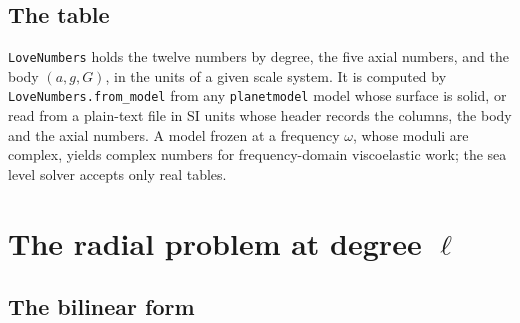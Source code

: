 \documentclass[11pt,a4paper]{article}
\newcommand{\code}[1]{\texttt{#1}}
\numberwithin{equation}{section}
\begin{document}
\subsection{The table}

\code{LoveNumbers} holds the twelve numbers by degree, the five axial numbers,
and the body $(a,g,G)$, in the units of a given scale system. It is computed by
\code{LoveNumbers.from\_model} from any \texttt{planetmodel} model whose
surface is solid, or read from a plain-text file in SI units whose header
records the columns, the body and the axial numbers. A model frozen at a
frequency $\omega$, whose moduli are complex, yields complex numbers for
frequency-domain viscoelastic work; the sea level solver accepts only real
tables.

\section{The radial problem at degree \texorpdfstring{$\ell$}{l}}
\label{sec:radial}

\subsection{The bilinear form}
\end{document}
